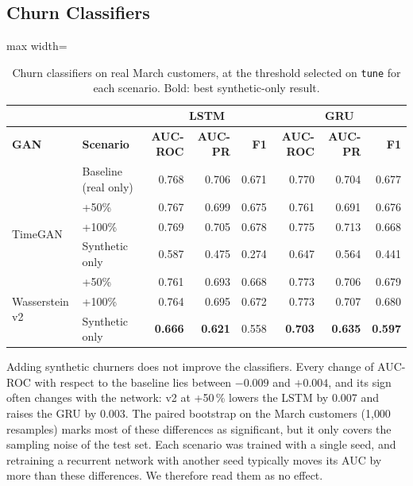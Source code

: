 \documentclass{article}
\begin{document}
\subsection{Churn Classifiers}

\begin{table}[H]
\centering
\renewcommand{\arraystretch}{1.3}
\begin{adjustbox}{max width=\textwidth}
\begin{tabular}{|l|l|rrr|rrr|}
\hline
 & & \multicolumn{3}{c|}{\textbf{LSTM}} & \multicolumn{3}{c|}{\textbf{GRU}} \\ \hline
\textbf{GAN} & \textbf{Scenario} & \textbf{AUC-ROC} & \textbf{AUC-PR} & \textbf{F1} & \textbf{AUC-ROC} & \textbf{AUC-PR} & \textbf{F1} \\ \hline
 & Baseline (real only) & 0.768 & 0.706 & 0.671 & 0.770 & 0.704 & 0.677 \\ \hline
\multirow{3}{*}{TimeGAN} & +50\% & 0.767 & 0.699 & 0.675 & 0.761 & 0.691 & 0.676 \\
 & +100\% & 0.769 & 0.705 & 0.678 & 0.775 & 0.713 & 0.668 \\
 & Synthetic only & 0.587 & 0.475 & 0.274 & 0.647 & 0.564 & 0.441 \\ \hline
\multirow{3}{*}{Wasserstein v2} & +50\% & 0.761 & 0.693 & 0.668 & 0.773 & 0.706 & 0.679 \\
 & +100\% & 0.764 & 0.695 & 0.672 & 0.773 & 0.707 & 0.680 \\
 & Synthetic only & \textbf{0.666} & \textbf{0.621} & 0.558 & \textbf{0.703} & \textbf{0.635} & \textbf{0.597} \\ \hline
\end{tabular}
\end{adjustbox}
\caption{Churn classifiers on real March customers, at the threshold selected on \texttt{tune} for each scenario. Bold: best synthetic-only result.}
\label{tab:w5_bridge_clf}
\end{table}

Adding synthetic churners does not improve the classifiers. Every change of AUC-ROC with respect to the baseline lies between $-0.009$ and $+0.004$, and its sign often changes with the network: v2 at +50\,\% lowers the LSTM by 0.007 and raises the GRU by 0.003. The paired bootstrap on the March customers (1{,}000 resamples) marks most of these differences as significant, but it only covers the sampling noise of the test set. Each scenario was trained with a single seed, and retraining a recurrent network with another seed typically moves its AUC by more than these differences. We therefore read them as no effect.
\end{document}
